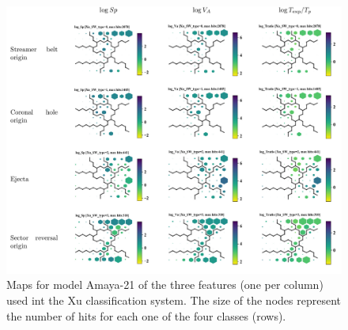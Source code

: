 \documentclass[utf8]{frontiersSCNS} %
\begin{document}
%		
%		
%		
\begin{figure}[h!]\centering
	\includegraphics[width=18cm]{SWtypeXu}
	\caption{Maps for model Amaya-21 of the three features (one per column) used int the Xu classification system. The size of the nodes represent the number of hits for each one of the four classes (rows).}\label{fig:SWtXu}
\end{figure}
\end{document}
